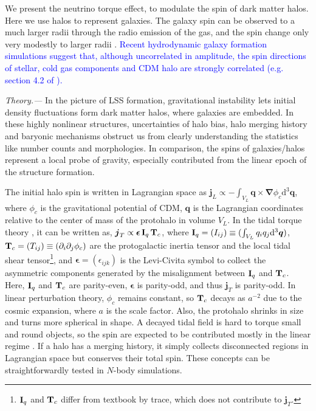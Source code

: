\documentclass[aps,prd,twocolumn,amsmath,amssymb,amsfont,superscriptaddress,nofootinbib]{revtex4-1}
\newcommand{\bs}{\boldsymbol}
\newcommand{\diff}{{\mathrm d}}
\newcommand{\T}{\bold{T}}
\newcommand{\I}{\bold{I}}
\newcommand{\spin}{\bs{j}}
\newcommand{\tcb}{\textcolor{blue}}
\begin{document}
We present the neutrino torque effect, to modulate the spin of dark matter halos.
Here we use halos to represent galaxies.
The galaxy spin can be observed to a much larger radii through the radio emission of the gas, and the spin change only very modestly to larger radii \citep{wiki:Galaxy_rotation_curve}. 
\tcb{Recent hydrodynamic galaxy formation simulations suggest that, although uncorrelated in amplitude, the spin directions of stellar, 
cold gas components and CDM halo are strongly correlated (e.g. section 4.2 of \citep{2018arXiv180407306J}). 
}

\textit{Theory.---}
In the picture of LSS formation, gravitational instability lets initial density fluctuations form dark matter halos, where galaxies are embedded.
In these highly nonlinear structures, uncertainties of halo bias, 
halo merging history and baryonic mechanisms obstruct us from clearly 
understanding the statistics like number counts and morphologies.
In comparison, the spins of galaxies/halos represent a local probe of gravity, 
especially contributed from the linear epoch of the structure formation. 

The initial halo spin is written in Lagrangian space as 
$\spin_L\propto-\int_{V_L}\bs{q}\times\bs{\nabla}\phi_c\diff^3\bs{q}$, 
where $\phi_c$ is the gravitational potential of CDM, 
$\bs{q}$ is the Lagrangian coordinates relative to the center of mass of the protohalo in volume $V_L$. 
In the tidal torque theory \citep{1984ApJ...286...38W},
it can be written as,
$\spin_T\propto\bs{\epsilon}\,\I_q\,\T_c$, where
$\I_q=(I_{ij})\equiv(\int_{V_L} q_i q_j \diff^3\bs{q})$,
$\T_c=(T_{ij})\equiv(\partial_i\partial_j\phi_c)$
are the protogalactic inertia tensor and the local tidal shear tensor\footnote{$\I_q$ 
and $\T_c$ differ from textbook by trace, which does not contribute to $\spin_T$.}, 
and $\bs{\epsilon}=(\epsilon_{ijk})$ is the Levi-Civita symbol to collect the asymmetric components generated by
the misalignment between $\I_q$ and $\T_c$. Here, $\I_q$ and $\T_c$ are parity-even, $\bs{\epsilon}$ is parity-odd, and thus $\spin_T$ is parity-odd.
In linear perturbation theory, $\phi_c$ remains constant, so $\T_c$ decays as $a^{-2}$ due to the cosmic expansion, where $a$ is the scale factor.
Also, the protohalo shrinks in size and turns more spherical in shape.
A decayed tidal field is hard to torque small and round objects, so the spin are expected to be contributed mostly in the linear regime \citep{2002MNRAS.332..325P}.
If a halo has a merging history, it simply collects disconnected regions in Lagrangian space but conserves their total spin.
These concepts can be straightforwardly tested in $N$-body simulations.
\end{document}
